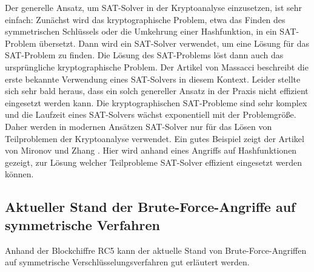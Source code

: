 Der generelle Ansatz, um SAT-Solver in der Kryptoanalyse einzusetzen, ist sehr einfach: Zunächst wird das kryptographische Problem, etwa das Finden des symmetrischen Schlüssels oder die Umkehrung einer Hashfunktion, in ein SAT-Problem übersetzt. Dann wird ein SAT-Solver verwendet, um eine Lösung für das SAT-Problem zu finden. Die Lösung des SAT-Problems löst dann auch das ursprüngliche kryptographische Problem.
Der Artikel von Massacci \cite{Massacci2000} beschreibt die erste bekannte Verwendung eines SAT-Solvers in diesem Kontext. Leider stellte sich sehr bald heraus, dass ein solch genereller Ansatz in der Praxis nicht effizient eingesetzt werden kann. Die kryptographischen SAT-Probleme sind sehr komplex und die Laufzeit eines SAT-Solvers wächst exponentiell mit der Problemgröße. Daher werden in modernen Ansätzen SAT-Solver nur für das Lösen von Teilproblemen der Kryptoanalyse verwendet. Ein gutes Beispiel zeigt der Artikel von Mironov und Zhang \cite{Mironov2006}. Hier wird anhand eines Angriffs auf Hashfunktionen gezeigt, zur Lösung welcher Teilprobleme SAT-Solver effizient eingesetzt werden können.





\subsection{Aktueller Stand der Brute-Force-Angriffe auf symmetrische Verfahren}
\label{cm_Brute-force-versus-Symmetr}

Anhand der Blockchiffre RC5 kann der aktuelle Stand von Brute-Force-Angriffen
auf symmetrische Verschlüsselungsverfahren gut erläutert werden.

